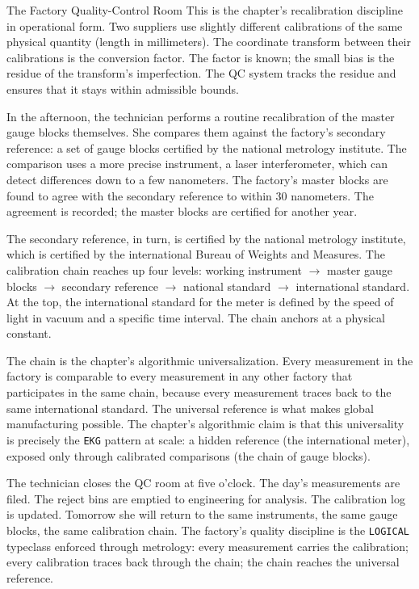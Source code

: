 \begin{coda}{The Factory Quality-Control Room}
This is the chapter's recalibration discipline in operational form.
Two suppliers use slightly different calibrations of the same physical
quantity (length in millimeters). The coordinate transform between
their calibrations is the conversion factor. The factor is known;
the small bias is the residue of the transform's imperfection. The
QC system tracks the residue and ensures that it stays within
admissible bounds.

In the afternoon, the technician performs a routine recalibration of
the master gauge blocks themselves. She compares them against the
factory's secondary reference: a set of gauge blocks certified by the
national metrology institute. The comparison uses a more precise
instrument, a laser interferometer, which can detect differences down
to a few nanometers. The factory's master blocks are found to agree
with the secondary reference to within 30 nanometers. The agreement
is recorded; the master blocks are certified for another year.

The secondary reference, in turn, is certified by the national
metrology institute, which is certified by the international Bureau
of Weights and Measures. The calibration chain reaches up four
levels: working instrument $\to$ master gauge blocks $\to$
secondary reference $\to$ national standard $\to$ international
standard. At the top, the international standard for the meter is
defined by the speed of light in vacuum and a specific time
interval. The chain anchors at a physical constant.

The chain is the chapter's algorithmic universalization. Every
measurement in the factory is comparable to every measurement in
any other factory that participates in the same chain, because every
measurement traces back to the same international standard. The
universal reference is what makes global manufacturing possible. The
chapter's algorithmic claim is that this universality is precisely
the \texttt{EKG} pattern at scale: a hidden reference (the
international meter), exposed only through calibrated comparisons
(the chain of gauge blocks).

The technician closes the QC room at five o'clock. The day's
measurements are filed. The reject bins are emptied to engineering
for analysis. The calibration log is updated. Tomorrow she will
return to the same instruments, the same gauge blocks, the same
calibration chain. The factory's quality discipline is the
\texttt{LOGICAL} typeclass enforced through metrology: every
measurement carries the calibration; every calibration traces back
through the chain; the chain reaches the universal reference.

\end{coda}
